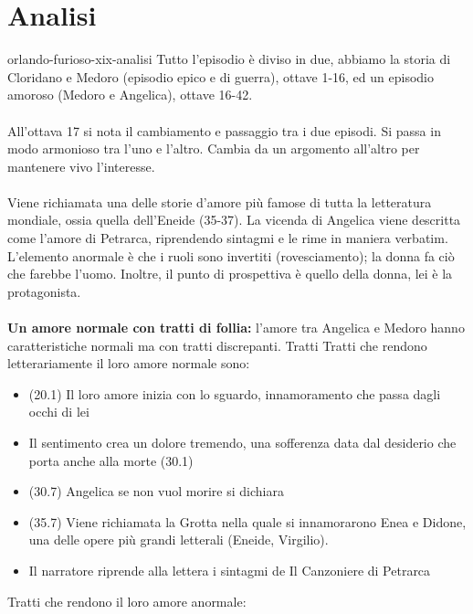 \documentclass[preview]{standalone}
\begin{document}
\genpage

\section{Analisi}

\begin{snippet}{orlando-furioso-xix-analisi}
    Tutto l'episodio è diviso in due,
    abbiamo la storia di Cloridano e Medoro (episodio epico e di guerra), ottave 1-16, 
    ed un episodio amoroso (Medoro e Angelica), ottave 16-42.
    \\\\
    All'ottava 17 si nota il cambiamento e passaggio tra i due episodi.
    Si passa in modo armonioso tra l'uno e l'altro.
    Cambia da un argomento all'altro per mantenere vivo l'interesse.
    \\\\
    Viene richiamata una delle storie d'amore più famose di tutta la letteratura mondiale,
    ossia quella dell'Eneide (35-37).
    La vicenda di Angelica viene descritta come l'amore di Petrarca, riprendendo sintagmi
    e le rime in maniera verbatim.
    L'elemento anormale è che i ruoli sono invertiti (rovesciamento); la donna
    fa ciò che farebbe l'uomo. Inoltre, il punto di prospettiva è quello della donna,
    lei è la protagonista.
    \\\\
    \textbf{Un amore normale con tratti di follia:}
    l'amore tra Angelica e Medoro hanno caratteristiche normali ma con tratti discrepanti.
    Tratti Tratti che rendono letterariamente il loro amore normale sono:
    \begin{itemize}
        \item (20.1) Il loro amore inizia con lo sguardo, innamoramento che passa dagli occhi di lei
        \item Il sentimento crea un dolore tremendo, una sofferenza data dal desiderio che porta anche
        alla morte (30.1)
        \item (30.7) Angelica se non vuol morire si dichiara
        \item (35.7) Viene richiamata la Grotta nella quale si innamorarono Enea e Didone, una delle opere più grandi letterali (Eneide, Virgilio).
        \item Il narratore riprende alla lettera i sintagmi de Il Canzoniere di Petrarca
    \end{itemize}
    Tratti che rendono il loro amore anormale:
    \begin{itemize}

\end{itemize}
\end{snippet}
\end{document}
